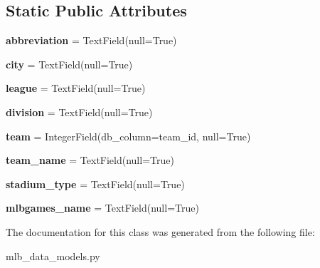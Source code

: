 \subsection*{Static Public Attributes}
\begin{DoxyCompactItemize}
\item 
{\bfseries abbreviation} = Text\+Field(null=True)\hypertarget{classmlb__data__models_1_1Team_ae9e97ff108abb5a98264a58d4e68da48}{}\label{classmlb__data__models_1_1Team_ae9e97ff108abb5a98264a58d4e68da48}

\item 
{\bfseries city} = Text\+Field(null=True)\hypertarget{classmlb__data__models_1_1Team_a526180f6e1bade6bee764691abf661bb}{}\label{classmlb__data__models_1_1Team_a526180f6e1bade6bee764691abf661bb}

\item 
{\bfseries league} = Text\+Field(null=True)\hypertarget{classmlb__data__models_1_1Team_a262d3d5d65371ceec02b6f19824cb9c8}{}\label{classmlb__data__models_1_1Team_a262d3d5d65371ceec02b6f19824cb9c8}

\item 
{\bfseries division} = Text\+Field(null=True)\hypertarget{classmlb__data__models_1_1Team_a5b0296ceabf90111feb1086c27d31e5b}{}\label{classmlb__data__models_1_1Team_a5b0296ceabf90111feb1086c27d31e5b}

\item 
{\bfseries team} = Integer\+Field(db\+\_\+column=\textquotesingle{}team\+\_\+id\textquotesingle{}, null=True)\hypertarget{classmlb__data__models_1_1Team_a31c1f2666b1e37c474ea91902a2fe8c4}{}\label{classmlb__data__models_1_1Team_a31c1f2666b1e37c474ea91902a2fe8c4}

\item 
{\bfseries team\+\_\+name} = Text\+Field(null=True)\hypertarget{classmlb__data__models_1_1Team_a54156a2cd6f8ebe655a824e16f00362d}{}\label{classmlb__data__models_1_1Team_a54156a2cd6f8ebe655a824e16f00362d}

\item 
{\bfseries stadium\+\_\+type} = Text\+Field(null=True)\hypertarget{classmlb__data__models_1_1Team_a5d99264424a100dfaeaf08d2c16f8da7}{}\label{classmlb__data__models_1_1Team_a5d99264424a100dfaeaf08d2c16f8da7}

\item 
{\bfseries mlbgames\+\_\+name} = Text\+Field(null=True)\hypertarget{classmlb__data__models_1_1Team_adedb9965ed2c736a89fd4ffbf370873a}{}\label{classmlb__data__models_1_1Team_adedb9965ed2c736a89fd4ffbf370873a}

\end{DoxyCompactItemize}


The documentation for this class was generated from the following file\+:\begin{DoxyCompactItemize}
\item 
mlb\+\_\+data\+\_\+models.\+py\end{DoxyCompactItemize}
